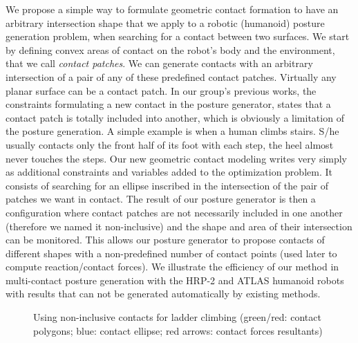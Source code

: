 We propose a simple way to formulate geometric contact formation to have an arbitrary intersection shape that we apply to a robotic (humanoid) posture generation problem, when searching for a contact between two surfaces.
We start by defining convex areas of contact on the robot's body and the environment, that we call \emph{contact patches}.
We can generate contacts with an arbitrary intersection of a pair of any of these predefined contact patches.
Virtually any planar surface can be a contact patch.
In our group's previous works, the constraints formulating a new contact in the posture generator, states that a contact patch is totally included into another, which is obviously a limitation of the posture generation.
A simple example is when a human climbs stairs.
S/he usually contacts only the front half of its foot with each step, the heel almost never touches the steps.
Our new geometric contact modeling writes very simply as additional constraints and variables added to the optimization problem.
It consists of searching for an ellipse inscribed in the intersection of the pair of patches we want in contact.
The result of our posture generator is then a configuration where contact patches are not necessarily included in one another (therefore we named it non-inclusive) and the shape and area of their intersection can be monitored.
This allows our posture generator to propose contacts of different shapes with a non-predefined number of contact points (used later to compute reaction/contact forces).
We illustrate the efficiency of our method in multi-contact posture generation with the HRP-2 and ATLAS humanoid robots with results that can not be generated automatically by existing methods.

\begin{figure}
\centering
  \centering
  \setlength\fboxsep{0pt}
  \setlength\fboxrule{1pt}
\caption{Using non-inclusive contacts for ladder climbing (green/red: contact polygons; blue: contact ellipse; red arrows: contact forces resultants)}
\label{fig:hrp2_jrl_complete}
\end{figure}

